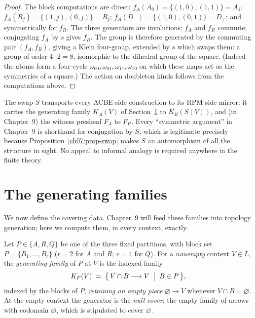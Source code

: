 \begin{proof}
The block computations are direct: $f_{A}(A_{0})=\{(1,0),(1,1)\}=A_{1}$; $f_{A}(R_{j})=\{(1,j),(0,j)\}=R_{j}$; $f_{A}(D_{=})=\{(1,0),(0,1)\}=D_{\neq}$; and symmetrically for $f_{R}$. The three generators are involutions; $f_{A}$ and $f_{R}$ commute; conjugating $f_{A}$ by $s$ gives $f_{R}$. The group is therefore generated by the commuting pair $(f_{A},f_{R})$, giving a Klein four-group, extended by $s$ which swaps them: a group of order $4\cdot 2=8$, isomorphic to the dihedral group of the square. (Indeed the atoms form a four-cycle $\omega_{00},\omega_{01},\omega_{11},\omega_{10}$ on which these maps act as the symmetries of a square.) The action on doubleton kinds follows from the computations above.
\end{proof}

\begin{remark}\label{ch07:rem-symmetry-use}
The swap $S$ transports every ACBE-side construction to its RPM-side mirror: it carries the generating family $K_{A}(V)$ of Section~\ref{ch07:sec-generating} to $K_{R}(S(V))$, and (in Chapter~9) the witness presheaf $F_{A}$ to $F_{R}$. Every ``symmetric argument'' in Chapter~9 is shorthand for conjugation by $S$, which is legitimate precisely because Proposition~\ref{ch07:prop-swap} makes $S$ an automorphism of all the structure in sight. No appeal to informal analogy is required anywhere in the finite theory.
\end{remark}

\section{The generating families}\label{ch07:sec-generating}

We now define the covering data. Chapter~9 will feed these families into topology generation; here we compute them, in every context, exactly.

\begin{definition}\label{ch07:def-generating}
Let $P\in\{A,R,Q\}$ be one of the three fixed partitions, with block set $P=\{B_{1},\dots,B_{r}\}$ ($r=2$ for $A$ and $R$; $r=4$ for $Q$). For a \emph{nonempty} context $V\in L$, the \emph{generating family} of $P$ at $V$ is the indexed family
\[
K_{P}(V)\;=\;\bigl\{\,V\cap B\longrightarrow V \;\bigm|\; B\in P \,\bigr\},
\]
indexed by the blocks of $P$, \emph{retaining an empty piece} $\varnothing\to V$ whenever $V\cap B=\varnothing$. At the empty context the generator is the \emph{null cover}: the empty family of arrows with codomain $\varnothing$, which is stipulated to cover $\varnothing$.
\end{definition}

